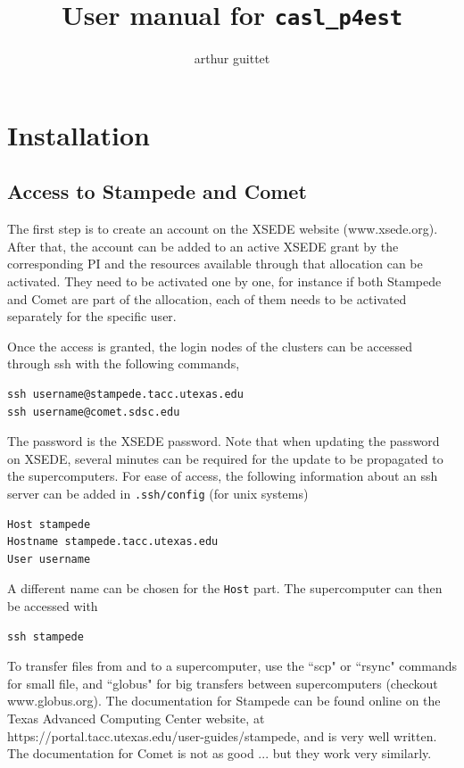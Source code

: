\documentclass{article}
\begin{document}
\title{User manual for \texttt{casl\_p4est}}

\author{arthur guittet}

\maketitle

\tableofcontents

\section{Installation}

\subsection{Access to Stampede and Comet}

The first step is to create an account on the XSEDE website (www.xsede.org). After that, the account can be added to an active XSEDE grant by the corresponding PI and the resources available through that allocation can be activated. They need to be activated one by one, for instance if both Stampede and Comet are part of the allocation, each of them needs to be activated separately for the specific user.

Once the access is granted, the login nodes of the clusters can be accessed through ssh with the following commands,
\begin{Verbatim}[frame=single]
ssh username@stampede.tacc.utexas.edu
ssh username@comet.sdsc.edu
\end{Verbatim}
The password is the XSEDE password. Note that when updating the password on XSEDE, several minutes can be required for the update to be propagated to the supercomputers. For ease of access, the following information about an ssh server can be added in \texttt{.ssh/config} (for unix systems)
\begin{Verbatim}[frame=single]
Host stampede
Hostname stampede.tacc.utexas.edu
User username
\end{Verbatim}
A different name can be chosen for the \texttt{Host} part. The supercomputer can then be accessed with
\begin{Verbatim}[frame=single]
ssh stampede
\end{Verbatim}

To transfer files from and to a supercomputer, use the ``scp" or ``rsync" commands for small file, and ``globus" for big transfers between supercomputers (checkout www.globus.org). The documentation for Stampede can be found online on the Texas Advanced Computing Center website, at https://portal.tacc.utexas.edu/user-guides/stampede, and is very well written. The documentation for Comet is not as good ... but they work very similarly.
\end{document}
